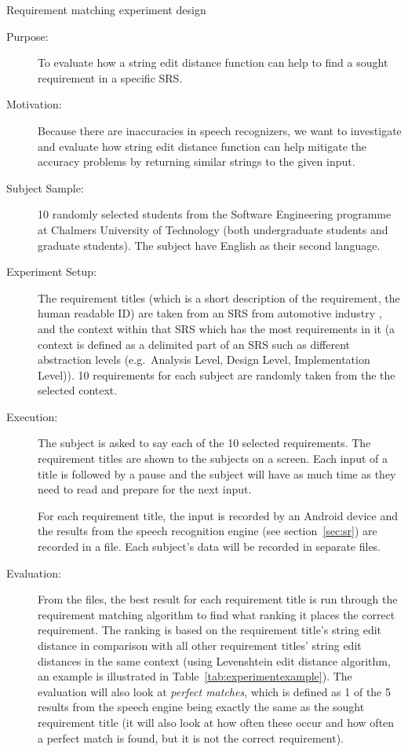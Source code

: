 \begin{framed}
    \begin{center}
    {\LARGE \sc Requirement matching experiment design}
    \begin{description}
    \item [Purpose:] To evaluate how a string edit distance function can help to find a sought requirement in a specific SRS.
    \item [Motivation:] Because there are inaccuracies in speech recognizers, we want to investigate and evaluate how string edit distance function can help mitigate the accuracy problems by returning similar strings to the given input.
    \item [Subject Sample:] 10 randomly selected students from the Software Engineering programme at Chalmers University of Technology (both undergraduate students and graduate students). The subject have English as their second language.
    \item[Experiment Setup:] The requirement titles (which is a short description of the requirement, the human readable ID) are taken from an SRS from automotive industry , and the context within that SRS which has the most requirements in it (a context is defined as a delimited part of an SRS such as different abstraction levels (e.g.\ Analysis Level, Design Level, Implementation Level)). 10 requirements for each subject are randomly taken from the the selected context. 
    \item[Execution:] The subject is asked to say each of the 10 selected requirements. The requirement titles are shown to the subjects on a screen. Each input of a title is followed by a pause and the subject will have as much time as they need to read and prepare for the next input.

    For each requirement title, the input is recorded by an Android device and the results from the speech recognition engine (see section~\ref{sec:sr}) are recorded in a file. Each subject's data will be recorded in separate files.
    \item[Evaluation:] From the files, the best result for each requirement title is run through the requirement matching algorithm to find what ranking it places the correct requirement. The ranking is based on the requirement title's string edit distance in comparison with all other requirement titles' string edit distances in the same context (using Levenshtein edit distance algorithm, an example is illustrated in Table~\ref{tab:experimentexample}).
    The evaluation will also look at \emph{perfect matches}, which is defined as 1 of the 5 results from the speech engine being exactly the same as the sought requirement title (it will also look at how often these occur and how often a perfect match is found, but it is not the correct requirement).
    \end{description} 
    \end{center}
\end{framed}

